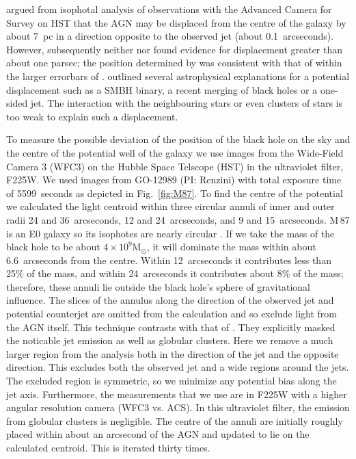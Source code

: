 \documentclass[useAMS,usenatbib]{mn2e}
\newcommand{\msun}{\mathrm{M}_\odot}
\begin{document}
\citet{2010ApJ...717L...6B} argued from isophotal analysis of
observations with the Advanced Camera for Survey on HST that the AGN
may be displaced from the centre of the galaxy by about 7~pc in a
direction opposite to the observed jet (about 0.1~arcseconds).
However, subsequently 
neither
\citet{2011ApJ...729..119G} nor \citet{2013ApJ...770...86W} found
evidence for displacement greater than about one parsec; the position
determined by \citet{2011ApJ...729..119G} was consistent with that of
\citet{2010ApJ...717L...6B} within the larger errorbars of
\citet{2011ApJ...729..119G}.  \citet{2010ApJ...717L...6B} outlined
several astrophysical explanations for a potential displacement such
as a SMBH binary, a recent merging of black holes or a one-sided jet.
The interaction with the neighbouring stars or even clusters of stars
is too weak to explain such a displacement.

To measure the possible deviation of the position of the black hole on
the sky and the centre of the potential well of the galaxy we use
images from the Wide-Field Camera 3 (WFC3) on the Hubble Space
Telscope (HST) in the ultraviolet filter, F225W.  We used images from
GO-12989 (PI: Renzini) with total exposure time of 5599~seconds as
depicted in Fig.~\ref{fig:M87}.  To find the centre of the potential
we 
calculated 
the light centroid within three circular annuli of inner
and outer radii 24 and 36~arcseconds, 12 and 24~arcseconds, and 9 and
15~arcseconds.  M\,87 is an E0 galaxy so its isophotes are nearly
circular \citep{2006ApJS..164..334F}.  If we take the mass of the
black hole to be about $4\times 10^9\msun$, it will dominate the mass
within about 6.6~arcseconds from the centre.  Within 12~arcseconds it
contributes less than 25\% of the mass, and within 24~arcseconds it
contributes about 8\% of the mass; therefore, these annuli lie outside
the black hole's sphere of gravitational influence.  The slices of the
annulus along the direction of the observed jet and potential
counterjet are omitted from the calculation and so exclude light from
the AGN itself.  This 
technique 
contrasts with that of
\citet{2010ApJ...717L...6B}.  They explicitly masked the noticable jet
emission as well as globular clusters.  Here we remove a much larger
region from the analysis both in the direction of the jet and the
opposite direction.  This excludes both the observed jet and a wide
regions around the jets.  The excluded region is symmetric, so we
minimize any potential bias along the jet axis.  Furthermore, the
measurements that we use are in F225W with a higher angular resolution
camera (WFC3 vs. ACS).  In this ultraviolet filter, the emission from
globular clusters is negligible.  The centre of the annuli are
initially roughly placed within about an arcsecond of the AGN and
updated to lie on the calculated centroid. This is iterated thirty
times.
\end{document}

